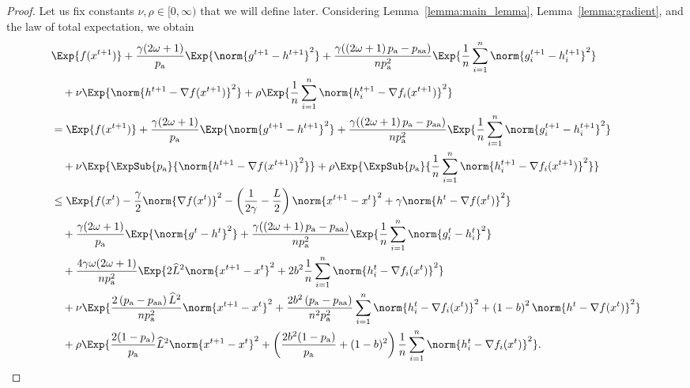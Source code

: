 \documentclass{article}
\newcommand*{\probavailable}{\ensuremath{p_{\textnormal{a}}}}
\newcommand*{\probpairaa}{\ensuremath{p_{\textnormal{aa}}}}
\begin{document}
\begin{proof}
  Let us fix constants $\nu, \rho \in [0,\infty)$ that we will define later. Considering Lemma~\ref{lemma:main_lemma}, Lemma~\ref{lemma:gradient}, and the law of total expectation, we obtain
    \begin{align*}
      &\Exp{f(x^{t + 1})} + \frac{\gamma (2 \omega + 1)}{\probavailable} \Exp{\norm{g^{t+1} - h^{t+1}}^2} + \frac{\gamma (\left(2 \omega + 1\right)\probavailable - \probpairaa)}{n \probavailable^2} \Exp{\frac{1}{n}\sum_{i=1}^n\norm{g^{t+1}_i - h^{t+1}_i}^2}\\
      &\quad  + \nu \Exp{\norm{h^{t+1} - \nabla f(x^{t+1})}^2} + \rho \Exp{\frac{1}{n}\sum_{i=1}^n\norm{h^{t+1}_i - \nabla f_i(x^{t+1})}^2}\\
      &=\Exp{f(x^{t + 1})} + \frac{\gamma (2 \omega + 1)}{\probavailable} \Exp{\norm{g^{t+1} - h^{t+1}}^2} + \frac{\gamma (\left(2 \omega + 1\right)\probavailable - \probpairaa)}{n \probavailable^2} \Exp{\frac{1}{n}\sum_{i=1}^n\norm{g^{t+1}_i - h^{t+1}_i}^2}\\
      &\quad  + \nu \Exp{\ExpSub{\probavailable}{\norm{h^{t+1} - \nabla f(x^{t+1})}^2}} + \rho \Exp{\ExpSub{\probavailable}{\frac{1}{n}\sum_{i=1}^n\norm{h^{t+1}_i - \nabla f_i(x^{t+1})}^2}}\\
      &\leq \Exp{f(x^t) - \frac{\gamma}{2}\norm{\nabla f(x^t)}^2 - \left(\frac{1}{2\gamma} - \frac{L}{2}\right)
      \norm{x^{t+1} - x^t}^2 + \gamma \norm{h^{t} - \nabla f(x^t)}^2}\nonumber\\
      &\quad + \frac{\gamma (2 \omega + 1)}{\probavailable}\Exp{\norm{g^{t} - h^t}^2}+ \frac{\gamma (\left(2 \omega + 1\right)\probavailable - \probpairaa)}{n \probavailable^2}\Exp{\frac{1}{n} \sum_{i=1}^n\norm{g^t_i - h^{t}_i}^2} \\
      &\quad + \frac{4 \gamma \omega (2 \omega + 1)}{n \probavailable^2} \Exp{2\widehat{L}^2\norm{x^{t+1} - x^{t}}^2 + 2b^2 \frac{1}{n}\sum_{i=1}^n \norm{h^t_i - \nabla f_i(x^{t})}^2} \\
      &\quad + \nu \Exp{\frac{2\left(\probavailable - \probpairaa\right)\widehat{L}^2}{n \probavailable^2} \norm{x^{t+1} - x^{t}}^2 + \frac{2 b^2 \left(\probavailable - \probpairaa\right)}{n^2 \probavailable^2} \sum_{i=1}^n \norm{h^t_i - \nabla f_i(x^{t})}^2 + \left(1 - b\right)^2 \norm{h^{t} - \nabla f(x^{t})}^2} \\
      &\quad + \rho \Exp{\frac{2(1 - \probavailable)}{\probavailable} \widehat{L}^2 \norm{x^{t+1} - x^{t}}^2 + \left(\frac{2 b^2 (1 - \probavailable)}{\probavailable} + (1 - b)^2\right) \frac{1}{n}\sum_{i=1}^n \norm{h^{t}_i - \nabla f_i(x^{t})}^2}.

\end{align*}
\end{proof}
\end{document}
